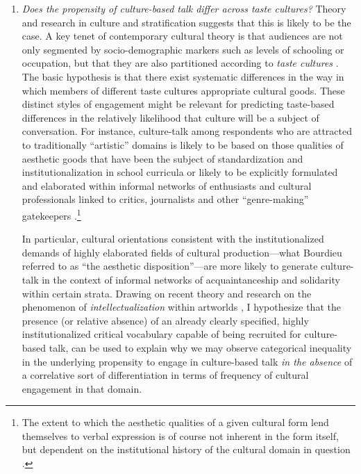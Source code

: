 \documentclass[11pt]{article}
\begin{document}
\begin{enumerate}
\item \emph{Does the propensity of culture-based talk differ across taste cultures?} Theory and research in culture and stratification suggests that this is likely to be the case.  A key tenet of contemporary cultural theory is that audiences are not only segmented by socio-demographic markers such as levels of schooling or occupation, but that they are also partitioned according to \emph{taste cultures} \citep{gans99, peterson_dimaggio75}.  The basic hypothesis is that there exist systematic differences in the way in which members of different taste cultures appropriate cultural goods.  These distinct styles of engagement might be relevant for predicting taste-based differences in the relatively likelihood that culture will be a subject of conversation.  For instance, culture-talk among respondents who are attracted to traditionally ``artistic'' domains is likely to be based on those qualities of aesthetic goods that have been the subject of standardization and institutionalization in school curricula or likely to be explicitly formulated and elaborated within informal networks of enthusiasts and cultural professionals linked to critics, journalists and other ``genre-making'' gatekeepers \citep{bourdieu93a, benzecry09, frith98, weber77}.\footnote{The extent to which the aesthetic qualities of a given cultural form lend themselves to verbal expression is of course not inherent in the form itself, but dependent on the institutional history of the cultural domain in question \citep{bourdieu93a, frith98, regev94}. } 

In particular, cultural orientations consistent with the institutionalized demands of highly elaborated fields of cultural production---what Bourdieu \citeyearpar{bourdieu84} referred to as ``the aesthetic disposition''---are more likely to generate culture-talk in the context of informal networks of acquaintanceship and solidarity within certain strata.  Drawing on recent theory and research on the phenomenon of \emph{intellectualization} within artworlds \citep{baumann01,ferguson98}, I hypothesize that the presence (or relative absence) of an already clearly specified, highly institutionalized critical vocabulary capable of being recruited for culture-based talk, can be used to explain why we may observe categorical inequality in the underlying propensity to engage in culture-based talk \emph{in the absence} of a correlative sort of differentiation in terms of frequency of cultural engagement in that domain.  
\end{enumerate}
\end{document}
